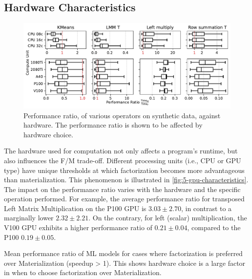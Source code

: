 \subsection{Hardware Characteristics}
\begin{figure}[ht]
    \centering
    \includegraphics[width=\linewidth]{chapters/05_cost_estimation/figures/motivation_speedup_per_operator_per_gpu.pdf}
    \caption[Performance ratio plotted against hardware]{Performance ratio, of various operators on synthetic data, against hardware. The performance ratio is shown to be affected by hardware choice.}
    \label{fig:5-gpu-characteristics}
\end{figure}
The hardware used for computation not only affects a program's runtime, but also influences the F/M trade-off. Different processing units (i.e., CPU or GPU type) have unique thresholds at which factorization becomes more advantageous than materialization. This phenomenon is illustrated in \autoref{fig:5-gpu-characteristics}. The impact on the performance ratio varies with the hardware and the specific operation performed. For example, the average performance ratio for transposed Left Matrix Multiplication on the P100 GPU is $3.03\pm2.70$, in contrast to a marginally lower $2.32\pm2.21$. On the contrary, for left (scalar) multiplication, the V100 GPU exhibits a higher performance ratio of $0.21\pm0.04$, compared to the P100 $0.19\pm0.05$.

\begin{table}[ht]
    \centering
    
    \caption[Performance ratio of ML models for cases where factorization has positive impact.]{Mean performance ratio of ML models for cases where factorization is preferred over Materialization (speedup > 1). This shows hardware choice is a large factor in when to choose factorization over Materialization.}
    \label{tab:5-speedup-per-gpu}
\end{table}

